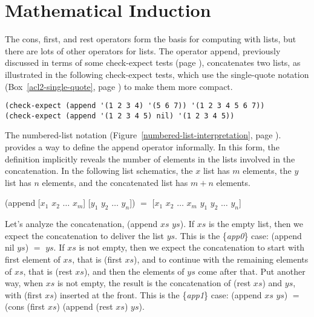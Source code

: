 \begin{exercises}


\end{exercises}

\section{Mathematical Induction}
\label{sec:induction}
The \textsf{cons}, \textsf{first}, and \textsf{rest} operators
form the basis for computing with lists,
but there are lots of other operators for lists.
The operator \textsf{append}, previously discussed in terms of some \textsf{check-expect} tests
(page \pageref{append-op-informal}), concatenates two lists, as illustrated
in the following \textsf{check-expect} tests,
which use the single-quote notation (Box~\ref{acl2-single-quote}, page \pageref{acl2-single-quote})
to make them more compact.

\begin{code}
\begin{verbatim}
(check-expect (append '(1 2 3 4) '(5 6 7)) '(1 2 3 4 5 6 7))
(check-expect (append '(1 2 3 4 5) nil) '(1 2 3 4 5))
\end{verbatim}
\end{code}

The numbered-list notation
(Figure~\ref{numbered-list-interpretation}, page \pageref{numbered-list-interpretation}).
provides a way to define the \textsf{append} operator informally.
In this form, the definition implicitly reveals the number of elements in the lists
involved in the concatenation.
\label{list-schematic} In the following list schematics,
the $x$ list has $m$ elements, the $y$ list has $n$ elements,
and the concatenated list has $m+n$ elements.
\begin{samepage}
\begin{center}
\textsf{(append [$x_1$ $x_2$ $\dots$ $x_m$] [$y_1$ $y_2$ $\dots$ $y_n$])} $=$
\textsf{[$x_1$ $x_2$ $\dots$ $x_m$ $y_1$ $y_2$ $\dots$ $y_n$]}
\end{center}
\end{samepage}

Let's analyze the concatenation, \textsf{(append $xs$ $ys$)}. %
If $xs$ is the empty list, then we expect
the concatenation to deliver the list $ys$.
This is the  \{\emph{app0}\} case: \textsf{(append nil $ys$)} $=$ $ys$.
If $xs$ is not empty, then we expect the concatenation
to start with first element of $xs$,
that is \textsf{(first $xs$)}, and to continue
with the remaining elements of $xs$, that is \textsf{(rest $xs$)},
and then the elements of $ys$ come after that.
Put another way, when $xs$ is not empty,
the result is the concatenation of \textsf{(rest $xs$)} and $ys$,
with \textsf{(first $xs$)} inserted at the front.
This is the \{\emph{app1}\} case: \textsf{(append $xs$ $ys$)} $=$
\textsf{(cons (first $xs$) (append (rest $xs$) $ys$)}.

